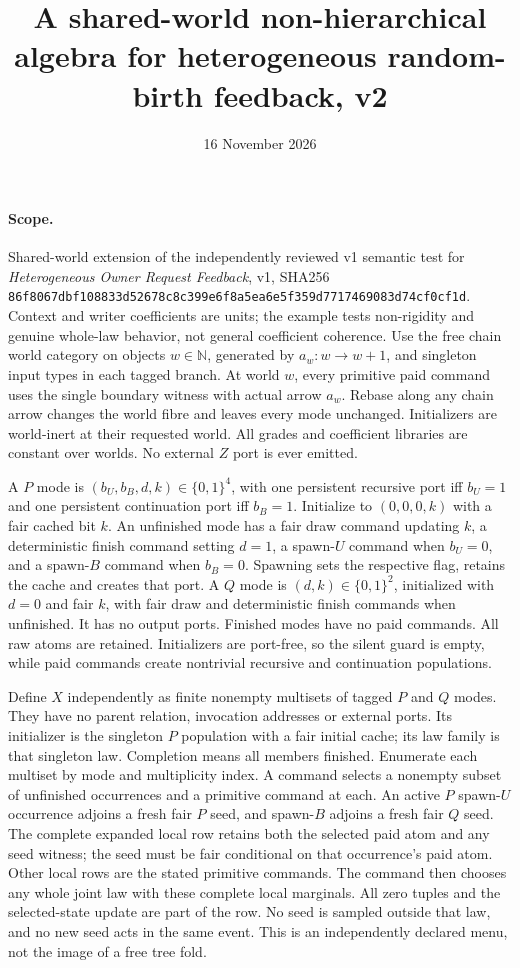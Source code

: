 \documentclass[11pt]{article}\usepackage{amsmath,amssymb,geometry}\geometry{margin=1in}
\title{A shared-world non-hierarchical algebra for heterogeneous random-birth feedback, v2}\date{16 November 2026}
\begin{document}
\maketitle
\paragraph{Scope.} Shared-world extension of the independently reviewed v1 semantic test for \emph{Heterogeneous Owner Request Feedback}, v1, SHA256 \texttt{86f8067dbf108833d52678c8c399e6f8a5ea6e5f359d7717469083d74cf0cf1d}. Context and writer coefficients are units; the example tests non-rigidity and genuine whole-law behavior, not general coefficient coherence. Use the free chain world category on objects $w\in\mathbb N$, generated by $a_w:w\to w+1$, and singleton input types in each tagged branch. At world $w$, every primitive paid command uses the single boundary witness with actual arrow $a_w$. Rebase along any chain arrow changes the world fibre and leaves every mode unchanged. Initializers are world-inert at their requested world. All grades and coefficient libraries are constant over worlds. No external $Z$ port is ever emitted.

A $P$ mode is $(b_U,b_B,d,k)\in\{0,1\}^4$, with one persistent recursive port iff $b_U=1$ and one persistent continuation port iff $b_B=1$. Initialize to $(0,0,0,k)$ with a fair cached bit $k$. An unfinished mode has a fair draw command updating $k$, a deterministic finish command setting $d=1$, a spawn-$U$ command when $b_U=0$, and a spawn-$B$ command when $b_B=0$. Spawning sets the respective flag, retains the cache and creates that port. A $Q$ mode is $(d,k)\in\{0,1\}^2$, initialized with $d=0$ and fair $k$, with fair draw and deterministic finish commands when unfinished. It has no output ports. Finished modes have no paid commands. All raw atoms are retained. Initializers are port-free, so the silent guard is empty, while paid commands create nontrivial recursive and continuation populations.

Define $X$ independently as finite nonempty multisets of tagged $P$ and $Q$ modes. They have no parent relation, invocation addresses or external ports. Its initializer is the singleton $P$ population with a fair initial cache; its law family is that singleton law. Completion means all members finished. Enumerate each multiset by mode and multiplicity index. A command selects a nonempty subset of unfinished occurrences and a primitive command at each. An active $P$ spawn-$U$ occurrence adjoins a fresh fair $P$ seed, and spawn-$B$ adjoins a fresh fair $Q$ seed. The complete expanded local row retains both the selected paid atom and any seed witness; the seed must be fair conditional on that occurrence's paid atom. Other local rows are the stated primitive commands. The command then chooses any whole joint law with these complete local marginals. All zero tuples and the selected-state update are part of the row. No seed is sampled outside that law, and no new seed acts in the same event. This is an independently declared menu, not the image of a free tree fold.
\end{document}
